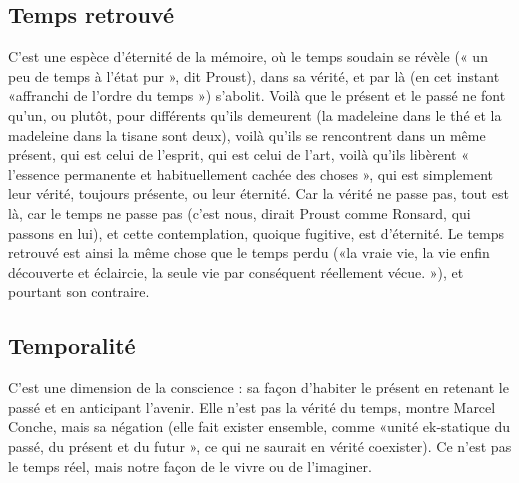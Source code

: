 \subsection{Temps retrouvé}
C’est une espèce d’éternité de la mémoire, où le temps
soudain se révèle (« un peu de temps à l’état pur », dit
Proust), dans sa vérité, et par là (en cet instant «affranchi de l’ordre du
temps ») s’abolit. Voilà que le présent et le passé ne font qu’un, ou plutôt, pour
différents qu’ils demeurent (la madeleine dans le thé et la madeleine dans la
tisane sont deux), voilà qu’ils se rencontrent dans un même présent, qui est
celui de l'esprit, qui est celui de l’art, voilà qu’ils libèrent « l’essence permanente
et habituellement cachée des choses », qui est simplement leur vérité, toujours
présente, ou leur éternité. Car la vérité ne passe pas, tout est là, car le temps ne
passe pas (c’est nous, dirait Proust comme Ronsard, qui passons en lui), et cette
contemplation, quoique fugitive, est d’éternité. Le temps retrouvé est ainsi la
même chose que le temps perdu («la vraie vie, la vie enfin découverte et
éclaircie, la seule vie par conséquent réellement vécue. »), et pourtant son
contraire.

\subsection{Temporalité}
C’est une dimension de la conscience : sa façon d’habiter
le présent en retenant le passé et en anticipant l'avenir.
Elle n’est pas la vérité du temps, montre Marcel Conche, mais sa négation (elle
fait exister ensemble, comme «unité ek-statique du passé, du présent et du
futur », ce qui ne saurait en vérité coexister). Ce n’est pas le temps réel, mais
notre façon de le vivre ou de l'imaginer.

